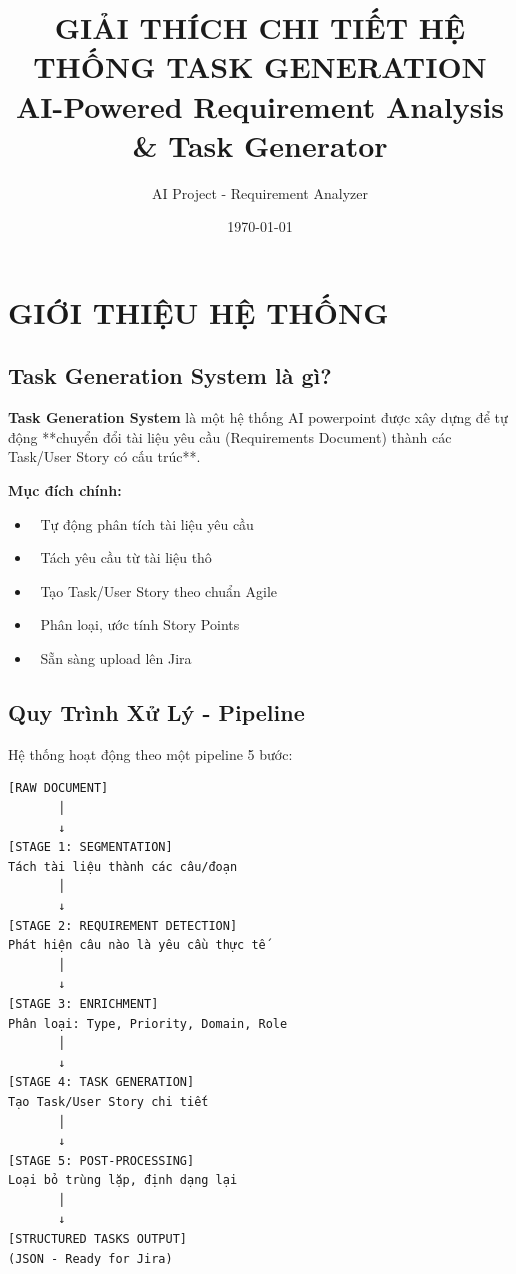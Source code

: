 \documentclass[12pt, a4paper]{report}
\title{\textbf{GIẢI THÍCH CHI TIẾT HỆ THỐNG TASK GENERATION}\\
\Large AI-Powered Requirement Analysis \& Task Generator}
\author{AI Project - Requirement Analyzer}
\date{\today}
\begin{document}
\maketitle
\tableofcontents
\newpage

\chapter{GIỚI THIỆU HỆ THỐNG}

\section{Task Generation System là gì?}

\textbf{Task Generation System} là một hệ thống AI powerpoint được xây dựng để tự động **chuyển đổi tài liệu yêu cầu (Requirements Document) thành các Task/User Story có cấu trúc**.

\begin{tcolorbox}[colback=blue!5, colframe=blue!50]
\textbf{Mục đích chính:}
\begin{itemize}
    \item 🎯 Tự động phân tích tài liệu yêu cầu
    \item 🎯 Tách yêu cầu từ tài liệu thô
    \item 🎯 Tạo Task/User Story theo chuẩn Agile
    \item 🎯 Phân loại, ước tính Story Points
    \item 🎯 Sẵn sàng upload lên Jira
\end{itemize}
\end{tcolorbox}

\section{Quy Trình Xử Lý - Pipeline}

Hệ thống hoạt động theo một pipeline 5 bước:

\begin{tcolorbox}[colback=yellow!5, colframe=yellow!50]
\begin{verbatim}
[RAW DOCUMENT]
       │
       ↓
[STAGE 1: SEGMENTATION]
Tách tài liệu thành các câu/đoạn
       │
       ↓
[STAGE 2: REQUIREMENT DETECTION]
Phát hiện câu nào là yêu cầu thực tế
       │
       ↓
[STAGE 3: ENRICHMENT]
Phân loại: Type, Priority, Domain, Role
       │
       ↓
[STAGE 4: TASK GENERATION]
Tạo Task/User Story chi tiết
       │
       ↓
[STAGE 5: POST-PROCESSING]
Loại bỏ trùng lặp, định dạng lại
       │
       ↓
[STRUCTURED TASKS OUTPUT]
(JSON - Ready for Jira)
\end{verbatim}
\end{tcolorbox}
\end{document}
